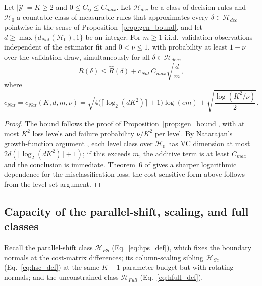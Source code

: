 \begin{proposition}\label{rem:natarajan_gen_bound}
    Let $|\mathcal{Y}| = K \geq 2$ and $0 \leq C_{ij} \leq C_{max}$. Let $\mathcal{H}_{dec}$ be a class of decision rules and $\mathcal{H}_0$ a countable class of measurable rules that approximates every $\delta \in \mathcal{H}_{dec}$ pointwise in the sense of Proposition~\ref{prop:gen_bound}, and let $d \geq \max\{d_{Nat}(\mathcal{H}_0), 1\}$ be an integer. For $m \geq 1$ i.i.d.\ validation observations independent of the estimator fit and $0 < \nu \leq 1$, with probability at least $1 - \nu$ over the validation draw, simultaneously for all $\delta \in \mathcal{H}_{dec}$,
    \begin{equation}
        R(\delta) \leq \hat{R}(\delta) + c_{Nat}\, C_{max} \sqrt{\frac{d}{m}},
    \end{equation}
    where
    \begin{equation*}
        c_{Nat} = c_{Nat}(K,d,m,\nu) = \sqrt{4\bigl(\lceil\log_2(dK^2)\rceil+1\bigr)\log(em)} + \sqrt{\frac{\log(K^2/\nu)}{2}}.
    \end{equation*}
\end{proposition}
\begin{proof}
    The bound follows the proof of Proposition~\ref{prop:gen_bound}, with at most $K^2$ loss levels and failure probability $\nu/K^2$ per level. By Natarajan's growth-function argument \citep{natarajan1989learning}, each level class over $\mathcal{H}_0$ has VC dimension at most $2d(\lceil\log_2(dK^2)\rceil+1)$; if this exceeds $m$, the additive term is at least $C_{max}$ and the conclusion is immediate. Theorem~6 of \citet{daniely2015multiclass} gives a sharper logarithmic dependence for the misclassification loss; the cost-sensitive form above follows from the level-set argument.
\end{proof}

\subsection{Capacity of the parallel-shift, scaling, and full classes}

Recall the parallel-shift class $\mathcal{H}_{PS}$ (Eq.~\ref{eq:hps_def}), which fixes the boundary normals at the cost-matrix differences; its column-scaling sibling $\mathcal{H}_{Sc}$ (Eq.~\ref{eq:hsc_def}) at the same $K-1$ parameter budget but with rotating normals; and the unconstrained class $\mathcal{H}_{Full}$ (Eq.~\ref{eq:hfull_def}).

